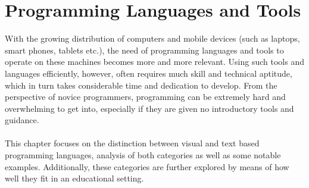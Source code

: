 \chapter{Programming Languages and Tools}
\label{chap:languages_and_tools}

With the growing distribution of computers and mobile devices (such as laptops, smart phones, tablets etc.), the need of programming languages and tools to operate on these machines becomes more and more relevant. Using such tools and languages efficiently, however, often requires much skill and technical aptitude, which in turn takes considerable time and dedication to develop. From the perspective of novice programmers, programming can be extremely hard and overwhelming to get into, especially if they are given no introductory tools and guidance.\\\\
This chapter focuses on the distinction between visual and text based programming languages, analysis of both categories as well as some notable examples. Additionally, these categories are further explored by means of how well they fit in an educational setting.   
	


